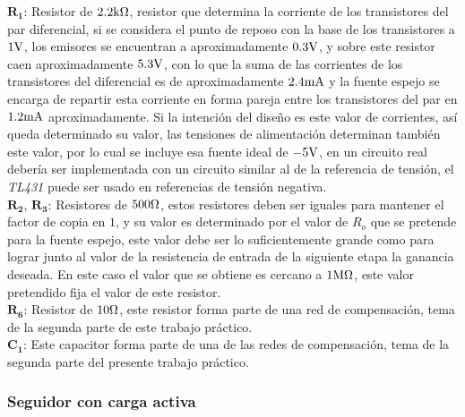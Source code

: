 $\bm{R_{1}}$: Resistor de $2.2 \si[per-mode=symbol]{\kilo\ohm}$, resistor que determina la corriente de los transistores del par diferencial, si se considera el punto de reposo con la base de los transistores a $1 \si[per-mode=symbol]{\volt}$, los emisores se encuentran a aproximadamente $0.3 \si[per-mode=symbol]{\volt}$, y sobre este resistor caen aproximadamente $5.3 \si[per-mode=symbol]{\volt}$, con lo que la suma de las corrientes de los transistores del diferencial es de aproximadamente $2.4 \si[per-mode=symbol]{\milli\ampere}$ y la fuente espejo se encarga de repartir esta corriente en forma pareja entre los transistores del par en $1.2 \si[per-mode=symbol]{\milli\ampere}$ aproximadamente. Si la intención del diseño es este valor de corrientes, así queda determinado su valor, las tensiones de alimentación determinan también este valor, por lo cual se incluye esa fuente ideal de $-5 \si[per-mode=symbol]{\volt}$, en un circuito real debería ser implementada con un circuito similar al de la referencia de tensión, el \textit{TL431} puede ser usado en referencias de tensión negativa.\\

$\bm{R_{2}}$, $\bm{R_{3}}$: Resistores de $500 \si[per-mode=symbol]{\ohm}$, estos resistores deben ser iguales para mantener el factor de copia en $1$, y su valor es determinado por el valor de $R_{o}$ que se pretende para la fuente espejo, este valor debe ser lo suficientemente grande como para lograr junto al valor de la resistencia de entrada de la siguiente etapa la ganancia deseada. En este caso el valor que se obtiene es cercano a $1 \si[per-mode=symbol]{\mega\ohm}$, este valor pretendido fija el valor de este resistor.\\

$\bm{R_{6}}$: Resistor de $10 \si[per-mode=symbol]{\ohm}$, este resistor forma parte de una red de compensación, tema de la segunda parte de este trabajo práctico.\\

$\bm{C_{1}}$: Este capacitor forma parte de una de las redes de compensación, tema de la segunda parte del presente trabajo práctico.\\


\subsubsection{Seguidor con carga activa}

